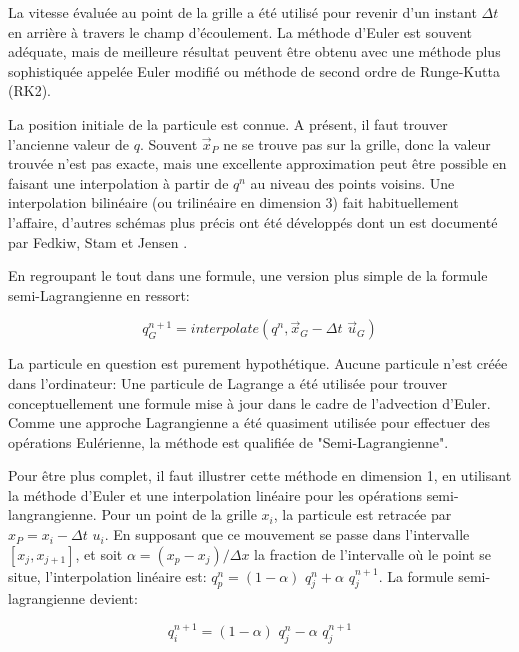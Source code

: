 \documentclass[11pt]{report}
\begin{document}
La vitesse évaluée au point de la grille a été utilisé pour revenir d'un instant $\Delta t$ en arrière à travers le champ d'écoulement. La méthode d'Euler est souvent adéquate, mais de meilleure résultat peuvent être obtenu avec une méthode plus sophistiquée appelée Euler modifié ou méthode de second ordre de Runge-Kutta (RK2).\newline

La position initiale de la particule est connue. A présent, il faut trouver l'ancienne valeur de $ q $. Souvent $\overrightarrow{x}_P$ ne se trouve pas sur la grille, donc la valeur trouvée n'est pas exacte, mais une excellente approximation peut être possible en faisant une interpolation à partir de $q^n$ au niveau des points voisins. Une interpolation bilinéaire (ou trilinéaire en dimension 3) fait habituellement l'affaire, d'autres schémas plus précis ont été développés dont un est documenté par Fedkiw, Stam et Jensen \cite{fedkiw-stam-jensen-01}.\newline

En regroupant le tout dans une formule, une version plus simple de la formule semi-Lagrangienne en ressort:

\begin{equation}
q_G^{n+1} = interpolate(q^n, \overrightarrow{x}_G - \Delta t \,\, \overrightarrow{u}_G)
\end{equation}

La particule en question est purement hypothétique. Aucune particule n'est créée dans l'ordinateur: Une particule de Lagrange a été utilisée pour trouver conceptuellement une formule mise à jour dans le cadre de l'advection d'Euler. Comme une approche Lagrangienne a été quasiment utilisée pour effectuer des opérations Eulérienne, la méthode est qualifiée de "Semi-Lagrangienne".\newline

Pour être plus complet, il faut illustrer cette méthode en dimension 1, en utilisant la méthode d'Euler et une interpolation linéaire pour les opérations semi-langrangienne. Pour un point de la grille $x_i$, la particule est retracée par $x_P = x_i - \Delta t \,\, u_i$. En supposant que ce mouvement se passe dans l'intervalle $[x_j, x_{j+1}]$, et soit $\alpha = (x_p-x_j)/\Delta x$ la fraction de l'intervalle où le point se situe, l'interpolation linéaire est: $ q_p^n = (1-\alpha) \,\, q_j^n + \alpha \,\, q_j^{n+1}$. La formule semi-lagrangienne devient:

\begin{equation}
q_i^{n+1} = (1-\alpha) \,\, q_j^n - \alpha \,\, q_j^{n+1}
\end{equation}
\end{document}
